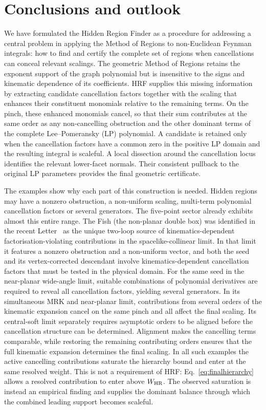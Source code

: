\documentclass[a4paper,11pt]{article}
\newcommand{\WHR}{W_{\rm HR}}
\begin{document}
\clearpage
\section{Conclusions and outlook}
\label{sec:conclusions}

We have formulated the Hidden Region Finder as a procedure for addressing a
central problem in applying the Method of Regions to non-Euclidean Feynman
integrals: how to find and certify the complete set of regions when
cancellations can conceal relevant scalings.  The geometric Method of Regions
retains the exponent support of the graph polynomial but is insensitive to
the signs and kinematic dependence of its coefficients.  HRF
supplies this missing information by extracting candidate cancellation
factors together with the scaling that enhances their constituent monomials
relative to the remaining terms.  On the pinch, these enhanced monomials
cancel, so that their sum contributes at the same order as any non-cancelling
obstruction and the other dominant terms of the complete Lee--Pomeransky (LP)
polynomial.  A candidate is retained
only when the cancellation factors have a common zero in the positive LP domain
and the resulting integral is scaleful.  A local dissection around the
cancellation locus identifies the relevant lower-facet normals.  Their
consistent pullback to the original LP parameters provides the final
geometric certificate.

The examples show why each part of this construction is needed.  Hidden
regions may have a nonzero obstruction, a non-uniform scaling, multi-term
polynomial cancellation factors or several generators.  The five-point
sector already exhibits almost this entire range.  The Fish (the non-planar
double box) was identified in the recent Letter~\cite{Chen:2026dnj} as the
unique two-loop source of kinematics-dependent factorisation-violating
contributions in the spacelike-collinear limit.  In that limit it features a
nonzero obstruction and a non-uniform vector, and both the seed and its
vertex-corrected descendant involve kinematics-dependent cancellation factors
that must be tested in the physical domain.  For the same seed in the
near-planar wide-angle limit, suitable combinations of polynomial derivatives
are required to reveal all cancellation factors, yielding several generators.
In its simultaneous MRK and near-planar limit, contributions from several
orders of the kinematic expansion cancel on the same pinch and all affect the
final scaling.  Its central-soft limit separately requires asymptotic orders
to be aligned before the cancellation structure can be determined.  Alignment
makes the cancelling terms comparable, while restoring the remaining
contributing orders ensures that the full kinematic expansion determines the
final scaling.  In all such examples the active cancelling contributions
saturate the hierarchy bound and enter at the same resolved weight.  This is
not a requirement of HRF: Eq.~\eqref{eq:finalhierarchy} allows a resolved
contribution to enter above \(\WHR\).  The observed saturation is instead an
empirical finding and supplies the dominant balance through which the combined
leading support becomes scaleful.
\end{document}
